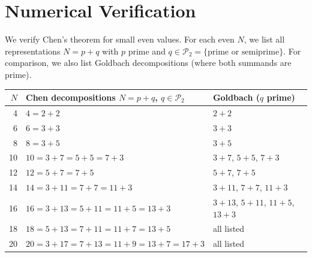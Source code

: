 \documentclass[12pt,a4paper]{amsart}
\theoremstyle{definition}
\newcommand{\Ptwo}{\mathcal{P}_2}
\begin{document}
\section{Numerical Verification}

We verify Chen's theorem for small even values.  For each even $N$,
we list all representations $N = p + q$ with $p$ prime and $q \in \Ptwo
= \{\text{prime or semiprime}\}$.  For comparison, we also list Goldbach
decompositions (where both summands are prime).

\begin{center}
\begin{tabular}{@{}r l l@{}}
\toprule
$N$ & Chen decompositions $N = p + q$, $q \in \Ptwo$ & Goldbach ($q$ prime) \\ \midrule
4   & $4 = 2 + 2$                                   & $2 + 2$ \\
6   & $6 = 3 + 3$                                   & $3 + 3$ \\
8   & $8 = 3 + 5$                                   & $3 + 5$ \\
10  & $10 = 3 + 7 = 5 + 5 = 7 + 3$                & $3+7$, $5+5$, $7+3$ \\
12  & $12 = 5 + 7 = 7 + 5$                         & $5+7$, $7+5$ \\
14  & $14 = 3 + 11 = 7 + 7 = 11 + 3$              & $3+11$, $7+7$, $11+3$ \\
16  & $16 = 3 + 13 = 5 + 11 = 11 + 5 = 13 + 3$   & $3+13$, $5+11$, $11+5$, $13+3$ \\
18  & $18 = 5 + 13 = 7 + 11 = 11 + 7 = 13 + 5$   & all listed \\
20  & $20 = 3 + 17 = 7 + 13 = 11 + 9 = 13 + 7 = 17 + 3$ & all listed \\
\bottomrule
\end{tabular}
\end{center}
\end{document}
